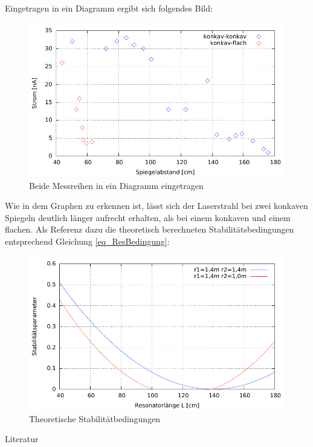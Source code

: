 Eingetragen in ein Diagramm ergibt sich folgendes Bild:
\begin{figure}[h!]
\includegraphics[scale=1]{../gnu/Abstand.pdf}
\caption{Beide Messreihen in ein Diagramm eingetragen}
\label{gra_abstand}
\end{figure}

Wie in dem Graphen zu erkennen ist, lässt sich der Laserstrahl bei zwei konkaven Spiegeln deutlich länger aufrecht erhalten, als bei einem konkaven und einem flachen. Als Referenz dazu die theoretisch berechneten Stabilitätsbedingungen entsprechend Gleichung \eqref{eq_ResBedingung}:
\begin{figure}[h!]
\includegraphics[scale=1]{../gnu/stabilitaetsparameter.pdf}
\caption{Theoretische Stabilitätbedingungen}
\label{gra_stabil}
\end{figure}



\parskip 340pt
\Large{Literatur}\\\\





